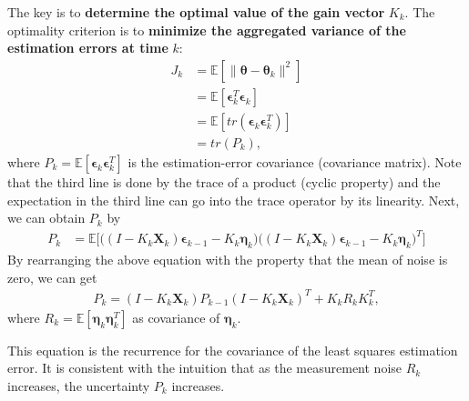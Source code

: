 The key is to \textbf{determine the optimal value of the gain vector} $K_k$. The optimality criterion is to \textbf{minimize the aggregated variance of the estimation errors at time} $k$: 
\begin{align*}
	J_k &= \mathbb{E}[\|\boldsymbol{\theta}-\boldsymbol{\theta}_k\|^2]\\
		&= \mathbb{E}[\boldsymbol{\epsilon}_{k}^T\boldsymbol{\epsilon}_{k}]\\
		&= \mathbb{E}[tr(\boldsymbol{\epsilon}_{k}\boldsymbol{\epsilon}_{k}^T)]\\
		&= tr(P_k),
\end{align*}
where $P_k=\mathbb{E}[\boldsymbol{\epsilon}_{k}\boldsymbol{\epsilon}_{k}^T]$ is the estimation-error covariance (\ie covariance matrix). Note that the third line is done by the trace of a product (\ie cyclic property) and the expectation in the third line can go into the trace operator by its linearity. Next, we can obtain $P_k$ by
\begin{align*}
	P_k &= \mathbb{E}\bigg[\big((I-K_k \mathbf{X}_k)\boldsymbol{\epsilon}_{k-1}-K_k\boldsymbol{\eta}_k\big)\big((I-K_k \mathbf{X}_k)\boldsymbol{\epsilon}_{k-1}-K_k\boldsymbol{\eta}_k\big)^T\bigg]
\end{align*}
By rearranging the above equation with the property that the mean of noise is zero, we can get
\begin{align}
	P_k = (I-K_k \mathbf{X}_k)P_{k-1}(I-K_k \mathbf{X}_k)^T+K_kR_kK_k^T,
	\label{eq:rls_estimation_cov}
\end{align}
where $R_k = \mathbb{E}[\boldsymbol{\eta}_k\boldsymbol{\eta}_k^T]$ as covariance of $\boldsymbol{\eta}_k$.

This equation is the recurrence for the covariance of the least squares estimation error. It is consistent with the intuition that as the measurement noise $R_k$ increases, the uncertainty $P_k$ increases. 

